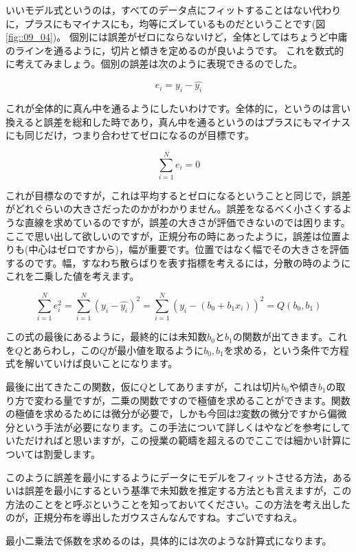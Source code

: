 \documentclass{ltjbook}
\begin{document}
いいモデル式というのは，すべてのデータ点にフィットすることはない代わりに，プラスにもマイナスにも，均等にズレているものだということです(図\ref{fig::09_04})。
個別には誤差がゼロにならないけど，全体としてはちょうど中庸のラインを通るように，切片と傾きを定めるのが良いようです。
これを数式的に考えてみましょう。個別の誤差は次のように表現できるのでした。

\[e_i = y_i - \hat{y_i} \]

これが全体的に真ん中を通るようにしたいわけです。全体的に，というのは言い換えると誤差を総和した時であり，真ん中を通るというのはプラスにもマイナスにも同じだけ，つまり合わせてゼロになるのが目標です。

\[\sum_{i=1}^N e_i = 0 \]

これが目標なのですが，これは平均するとゼロになるということと同じで，誤差がどれぐらいの大きさだったのかがわかりません。誤差をなるべく小さくするような直線を求めているのですが，誤差の大きさが評価できないのでは困ります。
ここで思い出して欲しいのですが，正規分布の時にあったように，誤差は位置よりも(中心はゼロですから)，幅が重要です。位置ではなく幅でその大きさを評価するのです。幅，すなわち散らばりを表す指標を考えるには，分散の時のようにこれを二乗した値を考えます。

\[\sum_{i=1}^N e_i^2=\sum_{i=1}^N (y_i - \hat{y_i})^2 = \sum_{i=1}^N (y_i - (b_0 + b_1x_i))^2=Q(b_0,b_1) \]

この式の最後にあるように，最終的には未知数$b_0$と$b_1$の関数が出てきます。これを$Q$とあらわし，この$Q$が最小値を取るように$b_0,b_1$を求める，という条件で方程式を解いていけば良いことになります。

最後に出てきたこの関数，仮に$Q$としてありますが，これは切片$b_0$や傾き$b_1$の取り方で変わる量ですが，二乗の関数ですので極値を求めることができます。関数の極値を求めるためには微分が必要で，しかも今回は2変数の微分ですから偏微分という手法が必要になります。この手法について詳しくは\textcite{kosugi2018}や\textcite{Nishiuchi201712}などを参考にしていただければと思いますが，この授業の範疇を超えるのでここでは細かい計算については割愛します。

このように誤差を最小にするようにデータにモデルをフィットさせる方法，あるいは誤差を最小にするという基準で未知数を推定する方法とも言えますが，この方法のことをと呼ぶということを知っておいてください。この方法を考え出したのが，正規分布を導出したガウスさんなんですね。すごいですねえ。

最小二乗法で係数を求めるのは，具体的には次のような計算式になります。
\end{document}
